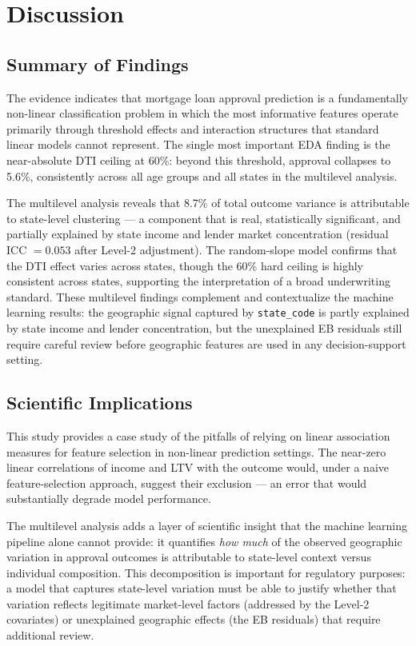 \documentclass[12pt,letterpaper]{article}
\begin{document}
\section{Discussion}

\subsection{Summary of Findings}

The evidence indicates that mortgage loan approval prediction is a fundamentally non-linear
classification problem in which the most informative features operate primarily through threshold
effects and interaction structures that standard linear models cannot represent. The single most
important EDA finding is the near-absolute DTI ceiling at 60\%: beyond this threshold, approval
collapses to 5.6\%, consistently across all age groups and all states in the multilevel analysis.

The multilevel analysis reveals that 8.7\% of total outcome variance is attributable to
state-level clustering --- a component that is real, statistically significant, and partially
explained by state income and lender market concentration (residual ICC $= 0.053$ after
Level-2 adjustment). The random-slope model confirms that the DTI effect varies across states,
though the 60\% hard ceiling is highly consistent across states, supporting the interpretation
of a broad underwriting standard. These multilevel findings complement and contextualize the
machine learning results: the geographic signal captured by \texttt{state\_code} is partly
explained by state income and lender concentration, but the unexplained EB residuals still require
careful review before geographic features are used in any decision-support setting.

\subsection{Scientific Implications}

This study provides a case study of the pitfalls of relying on linear association measures for
feature selection in non-linear prediction settings. The near-zero linear correlations of income
and LTV with the outcome would, under a naive feature-selection approach, suggest their
exclusion --- an error that would substantially degrade model performance.

The multilevel analysis adds a layer of scientific insight that the machine learning pipeline
alone cannot provide: it quantifies \emph{how much} of the observed geographic variation in
approval outcomes is attributable to state-level context versus individual composition.
This decomposition is important for regulatory purposes: a model that captures state-level
variation must be able to justify whether that variation reflects legitimate market-level factors
(addressed by the Level-2 covariates) or unexplained geographic effects (the EB residuals) that
require additional review.
\end{document}
